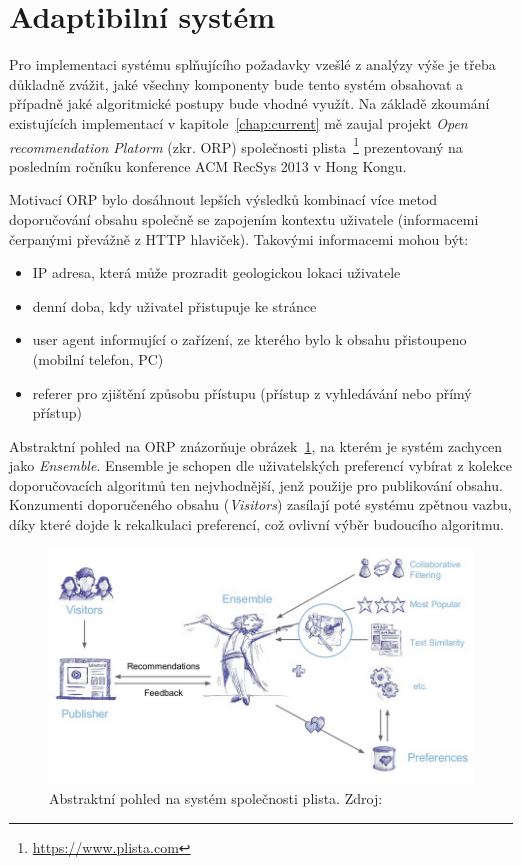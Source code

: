\documentclass[thesis=M,czech]{FITthesis}[2014/05/07]
\begin{document}
\section{Adaptibilní systém}

Pro implementaci systému splňujícího požadavky vzešlé z analýzy výše je třeba důkladně zvážit, jaké všechny komponenty bude tento systém obsahovat a případně jaké algoritmické postupy bude vhodné využít. Na základě zkoumání existujících implementací v kapitole~\ref{chap:current} mě zaujal projekt \emph{Open recommendation Platorm} (zkr. ORP) společnosti plista~\footnote{\url{https://www.plista.com}} prezentovaný na posledním ročníku konference ACM RecSys 2013 v Hong Kongu. 

Motivací ORP bylo dosáhnout lepších výsledků kombinací více metod doporučování obsahu společně se zapojením kontextu uživatele (informacemi čerpanými převážně z HTTP hlaviček). Takovými informacemi mohou být:

\begin{itemize}
	\item IP adresa, která může prozradit geologickou lokaci uživatele
	\item denní doba, kdy uživatel přistupuje ke stránce
	\item user agent informující o zařízení, ze kterého bylo k obsahu přistoupeno (mobilní telefon, PC)
	\item referer pro zjištění způsobu přístupu (přístup z vyhledávání nebo přímý přístup) 
\end{itemize}

Abstraktní pohled na ORP znázorňuje obrázek~\ref{fig:plista}, na kterém je systém zachycen jako \emph{Ensemble}. Ensemble je schopen dle uživatelských preferencí vybírat z kolekce doporučovacích algoritmů ten nejvhodnější, jenž použije pro publikování obsahu. Konzumenti doporučeného obsahu (\emph{Visitors}) zasílají poté systému zpětnou vazbu, díky které dojde k rekalkulaci preferencí, což ovlivní výběr budoucího algoritmu.

\begin{figure}\centering
	\includegraphics[width=1.0\textwidth]{obr/plistaEnsemble.png}
 	\caption[Abstraktní pohled na systém společnosti plista]{Abstraktní pohled na systém společnosti plista. Zdroj: \cite{slideshare:plista}}\label{fig:plista}
\end{figure}	
\end{document}
